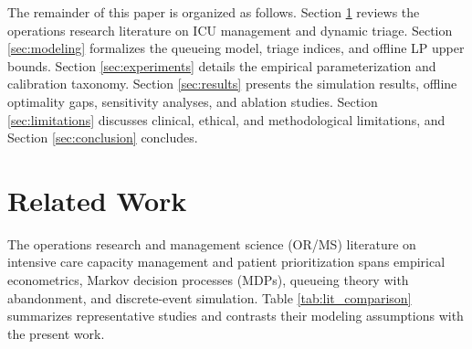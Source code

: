 \documentclass[final,5p,times,twocolumn]{elsarticle}
\begin{document}
The remainder of this paper is organized as follows. Section \ref{sec:works} reviews the operations research literature on ICU management and dynamic triage. Section \ref{sec:modeling} formalizes the queueing model, triage indices, and offline LP upper bounds. Section \ref{sec:experiments} details the empirical parameterization and calibration taxonomy. Section \ref{sec:results} presents the simulation results, offline optimality gaps, sensitivity analyses, and ablation studies. Section \ref{sec:limitations} discusses clinical, ethical, and methodological limitations, and Section \ref{sec:conclusion} concludes.

\section{Related Work}
\label{sec:works}

The operations research and management science (OR/MS) literature on intensive care capacity management and patient prioritization spans empirical econometrics, Markov decision processes (MDPs), queueing theory with abandonment, and discrete-event simulation. Table \ref{tab:lit_comparison} summarizes representative studies and contrasts their modeling assumptions with the present work.
\end{document}
